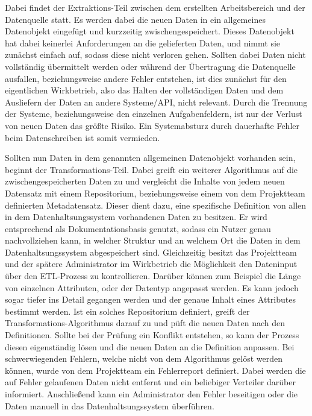Dabei findet der Extraktions\hyp{}Teil zwischen dem erstellten Arbeitsbereich
und der Datenquelle statt. Es werden dabei die neuen Daten in ein allgemeines
Datenobjekt eingefügt und kurzzeitig zwischengespeichert. Dieses Datenobjekt
hat dabei keinerlei Anforderungen an die gelieferten Daten, und nimmt sie
zunächst einfach auf, sodass diese nicht verloren gehen. Sollten dabei Daten
nicht vollständig übermittelt werden oder während der Übertragung die
Datenquelle ausfallen, beziehungsweise andere Fehler entstehen, ist dies
zunächst für den eigentlichen Wirkbetrieb, also das Halten der vollständigen
Daten und dem Ausliefern der Daten an andere Systeme/API, nicht relevant.
Durch die Trennung der Systeme, beziehungsweise den einzelnen Aufgabenfeldern,
ist nur der Verlust von neuen Daten das größte Risiko. Ein Systemabsturz durch
dauerhafte Fehler beim Datenschreiben ist somit vermieden.

Sollten nun Daten in dem genannten allgemeinen Datenobjekt vorhanden sein,
beginnt der Transformations\hyp{}Teil. Dabei greift ein weiterer Algorithmus
auf die zwischengespeicherten Daten zu und vergleicht die Inhalte von jedem
neuen Datensatz mit einem \gls{Repositorium}, beziehungsweise einem von dem
Projektteam definierten Metadatensatz. Dieser dient dazu, eine spezifische
Definition von allen in dem Datenhaltsungssystem vorhandenen Daten zu besitzen.
Er wird entsprechend als Dokumentationsbasis genutzt, sodass ein Nutzer genau
nachvollziehen kann, in welcher Struktur und an welchem Ort die Daten in dem
Datenhaltsungssystem abgespeichert sind. Gleichzeitig besitzt das Projektteam
und der spätere Administrator im Wirkbetrieb die Möglichkeit den Dateninput
über den ETL\hyp{}Prozess zu kontrollieren. Darüber können zum Beispiel die
Länge von einzelnen Attributen, oder der Datentyp angepasst werden. Es kann
jedoch sogar tiefer ins Detail gegangen werden und der genaue Inhalt eines
Attributes bestimmt werden. Ist ein solches \gls{Repositorium} definiert,
greift der Transformations\hyp{}Algorithmus darauf zu und püft die neuen Daten
nach den Definitionen. Sollte bei der Prüfung ein Konflikt entstehen, so kann
der Prozess diesen eigenständig lösen und die neuen Daten an die Definition
anpassen. Bei schwerwiegenden Fehlern, welche nicht von dem Algorithmus
gelöst werden können, wurde von dem Projektteam ein Fehlerreport definiert.
Dabei werden die auf Fehler gelaufenen Daten nicht entfernt und ein
beliebiger Verteiler darüber informiert. Anschließend kann ein Administrator
den Fehler beseitigen oder die Daten manuell in das Datenhaltsungssystem
überführen.

